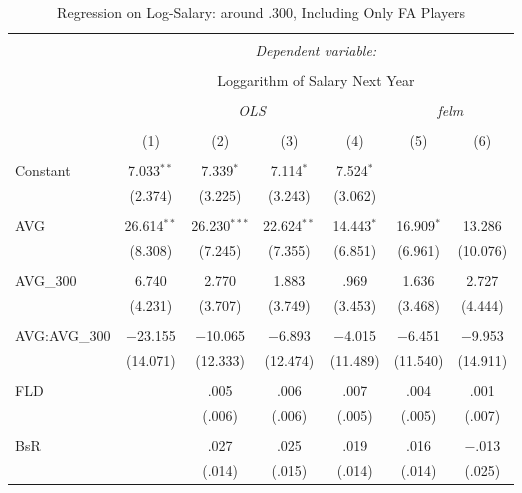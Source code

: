 
\begin{table}[H] \centering
  \caption{Regression on Log-Salary: around .300, Including Only FA Players}
  \label{AVG300_F}
\tiny
\begin{tabular}{@{\extracolsep{5pt}}lcccccc}
\\[-1.8ex]\hline
\hline \\[-1.8ex]
 & \multicolumn{6}{c}{\textit{Dependent variable:}} \\
\cline{2-7}
\\[-1.8ex] & \multicolumn{6}{c}{Loggarithm of Salary Next Year} \\
\\[-1.8ex] & \multicolumn{4}{c}{\textit{OLS}} & \multicolumn{2}{c}{\textit{felm}} \\
\\[-1.8ex] & (1) & (2) & (3) & (4) & (5) & (6)\\
\hline \\[-1.8ex]
 Constant & 7.033$^{**}$ & 7.339$^{*}$ & 7.114$^{*}$ & 7.524$^{*}$ &  &  \\
  & (2.374) & (3.225) & (3.243) & (3.062) &  &  \\
  & & & & & & \\
 AVG & 26.614$^{**}$ & 26.230$^{***}$ & 22.624$^{**}$ & 14.443$^{*}$ & 16.909$^{*}$ & 13.286 \\
  & (8.308) & (7.245) & (7.355) & (6.851) & (6.961) & (10.076) \\
  & & & & & & \\
 AVG\_300 & 6.740 & 2.770 & 1.883 & .969 & 1.636 & 2.727 \\
  & (4.231) & (3.707) & (3.749) & (3.453) & (3.468) & (4.444) \\
  & & & & & & \\
  AVG:AVG\_300 & $-$23.155 & $-$10.065 & $-$6.893 & $-$4.015 & $-$6.451 & $-$9.953 \\
  & (14.071) & (12.333) & (12.474) & (11.489) & (11.540) & (14.911) \\
  & & & & & & \\
 FLD &  & .005 & .006 & .007 & .004 & .001 \\
  &  & (.006) & (.006) & (.005) & (.005) & (.007) \\
  & & & & & & \\
 BsR &  & .027 & .025 & .019 & .016 & $-$.013 \\
  &  & (.014) & (.015) & (.014) & (.014) & (.025) \\

\end{tabular}
\end{table}
